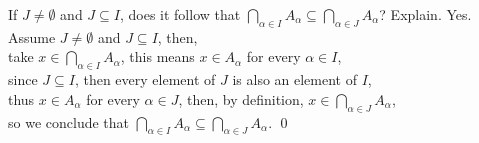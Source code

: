 \documentclass[DIN, pagenumber=false, fontsize=11pt, parskip=half]{scrartcl}
\begin{document}
\begin{problems}
    \problem If $J \neq \emptyset$ and $J \subseteq I$, does it follow that $\bigcap\limits_{\alpha \in I}A_{\alpha} \subseteq \bigcap\limits_{\alpha\in J}A_{\alpha}$? Explain.
    \answer  Yes.\\
             Assume $J \neq \emptyset$ and $J \subseteq I$, then,\\
             take $x \in \bigcap_{\alpha\in I} A_{\alpha}$, this means $x \in A_{\alpha}$ for every $\alpha \in I$,\\
             since $J \subseteq I$, then every element of $J$ is also an element of $I$,\\
             thus $x \in A_{\alpha}$ for every $\alpha \in J$,
             then, by definition, $x \in \bigcap_{\alpha \in J}A_{\alpha}$,\\
             so we conclude that $\bigcap\limits_{\alpha \in I}A_{\alpha} \subseteq \bigcap\limits_{\alpha\in J}A_{\alpha}$. \qed
\end{problems}
\end{document}
